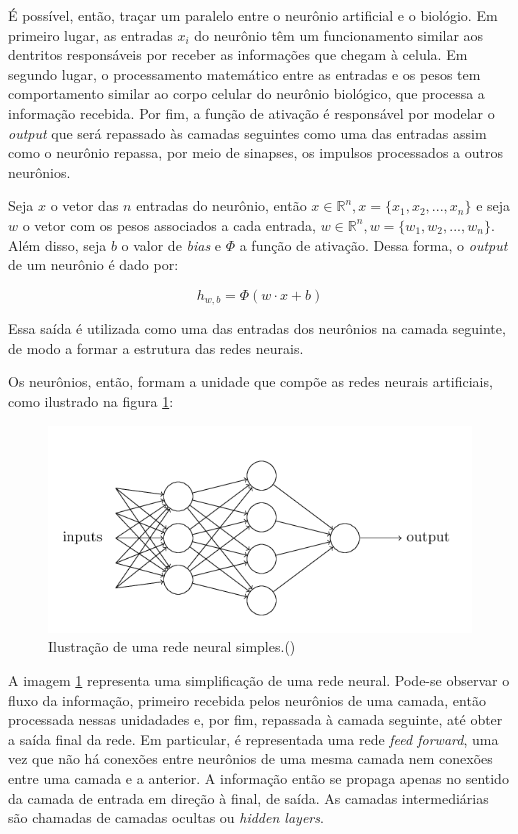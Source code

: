 É possível, então, traçar um paralelo entre o neurônio
artificial e o biológio. Em primeiro lugar, as entradas 
$x_i$ do neurônio  têm um funcionamento similar aos 
dentritos responsáveis 
por receber as informações que chegam à celula. Em segundo lugar,
o processamento matemático entre as entradas e os pesos 
tem comportamento similar ao corpo 
celular do neurônio biológico, que processa a informação 
recebida. Por fim, a função de ativação é responsável por modelar o 
\textit{output} que será repassado às camadas seguintes como uma das entradas
assim como o neurônio repassa, por meio de sinapses, os impulsos processados
a outros neurônios.


Seja $x$ o vetor das $n$ entradas do neurônio, então
$x \in \mathbb{R}^n, x=\{x_1, x_2, ..., x_n\}$ e seja 
$w$ o vetor com os pesos associados a cada entrada, 
$w \in \mathbb{R}^n, w=\{w_1, w_2, ..., w_n\}$. Além disso,
seja $b$ o valor de \textit{bias} e $\Phi$ a função de ativação.
Dessa forma, o \textit{output} de um neurônio é dado por:
 
\begin{equation}
  h_{w,b} = \Phi(w \cdot x + b)
\end{equation}

Essa saída é utilizada como uma das entradas dos neurônios
na camada seguinte, de modo a formar a estrutura das redes 
neurais. 


Os neurônios,
então, formam a unidade que compõe as redes neurais artificiais,
como ilustrado na figura \ref{fig:redeneural}:

\begin{figure}[H] 
  \includegraphics[width= 12cm]{../figuras/rede-neural.png}
  \caption{Ilustração de uma rede neural simples.(\cite{deeplearningbook})}
  \label{fig:redeneural}
\end{figure}

A imagem \ref{fig:redeneural} representa uma simplificação de uma 
rede neural. Pode-se observar o fluxo da informação, primeiro recebida pelos 
neurônios de uma camada, então processada nessas unidadades e, por fim, repassada à camada 
seguinte, até obter a saída final da rede. Em particular, é representada uma
rede \textit{feed forward}, uma vez que não há conexões entre neurônios de uma 
mesma camada nem conexões entre uma camada e a anterior. A informação então 
se propaga apenas no sentido da camada de entrada em direção à final, de saída.
As camadas intermediárias são chamadas de camadas ocultas ou \textit{hidden layers}.


